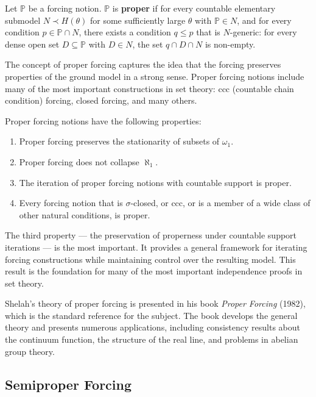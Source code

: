 \begin{definition}
Let \(\mathbb{P}\) be a forcing notion. \(\mathbb{P}\) is \textbf{proper} if for every countable elementary submodel \(N \prec H(\theta)\) for some sufficiently large \(\theta\) with \(\mathbb{P} \in N\), and for every condition \(p \in \mathbb{P} \cap N\), there exists a condition \(q \leq p\) that is \(N\)-generic: for every dense open set \(D \subseteq \mathbb{P}\) with \(D \in N\), the set \(q \cap D \cap N\) is non-empty.
\end{definition}

The concept of proper forcing captures the idea that the forcing preserves properties of the ground model in a strong sense. Proper forcing notions include many of the most important constructions in set theory: ccc (countable chain condition) forcing, closed forcing, and many others.

\begin{theorem}
Proper forcing notions have the following properties:
\begin{enumerate}
    \item Proper forcing preserves the stationarity of subsets of \(\omega_1\).
    \item Proper forcing does not collapse \(\aleph_1\).
    \item The iteration of proper forcing notions with countable support is proper.
    \item Every forcing notion that is \(\sigma\)-closed, or ccc, or is a member of a wide class of other natural conditions, is proper.
\end{enumerate}
\end{theorem}

The third property --- the preservation of properness under countable support iterations --- is the most important. It provides a general framework for iterating forcing constructions while maintaining control over the resulting model. This result is the foundation for many of the most important independence proofs in set theory.

Shelah's theory of proper forcing is presented in his book \textit{Proper Forcing} (1982), which is the standard reference for the subject. The book develops the general theory and presents numerous applications, including consistency results about the continuum function, the structure of the real line, and problems in abelian group theory.

\subsection{Semiproper Forcing}

